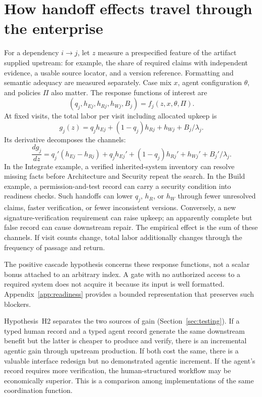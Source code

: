 \section{How handoff effects travel through the enterprise}
\label{sec:handoffs}

For a dependency $i\to j$, let $z$ measure a prespecified feature of the artifact supplied upstream:
for example, the share of required claims with independent evidence, a usable source locator, and a
version reference. Formatting and semantic adequacy are measured separately. Case mix $x$, agent
configuration $\theta$, and policies $\Pi$ also matter. The response functions of interest are
\begin{equation}
(q_j,h_{Ej},h_{Rj},h_{Wj},B_j)=f_j(z,x,\theta,\Pi). \label{eq:response}
\end{equation}
At fixed visits, the total labor per visit including allocated upkeep is
\[
g_j(z)=q_jh_{Ej}+(1-q_j)h_{Rj}+h_{Wj}+B_j/\lambda_j .
\]
Its derivative decomposes the channels:
\begin{equation}
\frac{dg_j}{dz}=q_j'(h_{Ej}-h_{Rj})+q_jh_{Ej}'+(1-q_j)h_{Rj}'+h_{Wj}'+B_j'/\lambda_j. \label{eq:channels}
\end{equation}
In the Integrate example, a verified inherited-system inventory can resolve missing facts before
Architecture and Security repeat the search. In the Build example, a permission-and-test record can carry a security condition into readiness checks. Such handoffs can lower $q_j$, $h_R$, or $h_W$ through
fewer unresolved claims, faster verification, or fewer inconsistent versions. Conversely, a new
signature-verification requirement can raise upkeep; an apparently complete but false record can
cause downstream repair. The empirical effect is the sum of these channels. If visit counts change,
total labor additionally changes through the frequency of passage and return.

The positive cascade hypothesis concerns these response functions, not a scalar bonus attached
to an arbitrary index. A gate with no authorized access to a required system does not acquire it
because its input is well formatted. Appendix~\ref{app:readiness} provides a bounded representation
that preserves such blockers.

Hypothesis~H2 separates the two sources of gain (Section~\ref{sec:testing}). If a typed human record and
a typed agent record generate the same downstream benefit but the latter is cheaper to produce and
verify, there is an incremental agentic gain through upstream production. If both cost the same,
there is a valuable interface redesign but no demonstrated agentic increment. If the agent's record
requires more verification, the human-structured workflow may be economically superior. This is a
comparison among implementations of the same coordination function.
